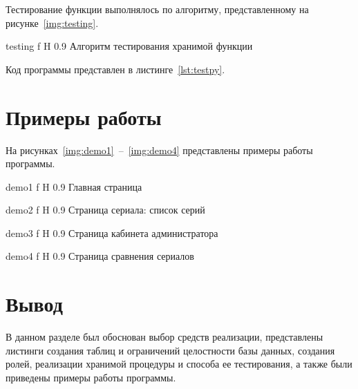

Тестирование функции выполнялось по алгоритму, представленному на рисунке~\ref{img:testing}.

    {testing}
    {f}
    {H}
    {0.9\textwidth}
    {Алгоритм тестирования хранимой функции}

Код программы представлен в листинге~\ref{lst:testpy}.




\section{Примеры работы}

На рисунках~\ref{img:demo1}~--~\ref{img:demo4} представлены примеры работы программы.

    {demo1}
    {f}
    {H}
    {0.9\textwidth}
    {Главная страница}

    {demo2}
    {f}
    {H}
    {0.9\textwidth}
    {Страница сериала: список серий}

    {demo3}
    {f}
    {H}
    {0.9\textwidth}
    {Страница кабинета администратора}

    {demo4}
    {f}
    {H}
    {0.9\textwidth}
    {Страница сравнения сериалов}

\section*{Вывод}

В данном разделе был обоснован выбор средств реализации, представлены листинги создания таблиц и ограничений целостности базы данных, создания ролей, реализации хранимой процедуры и способа ее тестирования, а также были приведены примеры работы программы.